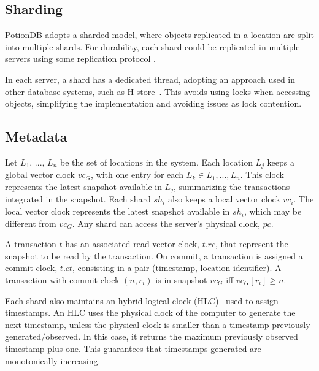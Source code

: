 \documentclass[sigplan,twocolumn,review,anonymous]{acmart}
\newcommand{\nuno}[1]{\nbnote{Nuno}{red}{#1}}
\begin{document}
\nuno{explicar como fazer?}


\subsection{Sharding}
\label{subsec:sharding}

PotionDB adopts a sharded model, where objects replicated in a location are 
split into multiple shards. For durability, each shard could be replicated in multiple
servers using some replication protocol \cite{paxos,raft}. %

In each server,  a shard has a dedicated thread, adopting an approach used in other
database systems, such as H-store~\cite{h-store}. This avoids using locks when 
accessing objects, simplifying the implementation and avoiding issues 
as lock contention.

\subsection{Metadata}
\label{subsec:metadata}


Let $L_1$, ..., $L_n$ be the set of locations in the system. 
Each location $L_j$ keeps a global vector clock $\mathit{vc}_G$, with one entry for each $L_k \in L_1, ..., L_n$.
This clock represents the latest snapshot available in $L_j$, summarizing the transactions integrated in the snapshot.
Each shard $\mathit{sh}_i$ also keeps a local vector clock $\mathit{vc}_i$.
The local vector clock represents the latest snapshot available in $sh_i$, which may be different 
from $\mathit{vc}_G$.
Any shard can access the server's physical clock, $\mathit{pc}$.

A transaction $t$ has an associated read vector clock, $t\!.\mathit{rc}$,  that represent the snapshot
to be read by the transaction. On commit, a transaction is assigned a commit clock, $t\!.\mathit{ct}$, consisting in a 
pair (timestamp, location identifier).  A transaction with commit clock $(n,r_i)$ is in snapshot $\mathit{vc}_G$ iff
$\mathit{vc}_G[r_i] \geq n$.

Each shard also maintains an hybrid logical clock (HLC)~\cite{hlc} used to assign timestamps. An HLC uses the 
physical clock of the computer to generate the next timestamp, unless the physical clock is smaller than a timestamp
previously generated/observed. In this case, it returns the maximum previously observed timestamp plus one. 
This guarantees that timestamps generated are monotonically increasing.
\end{document}

